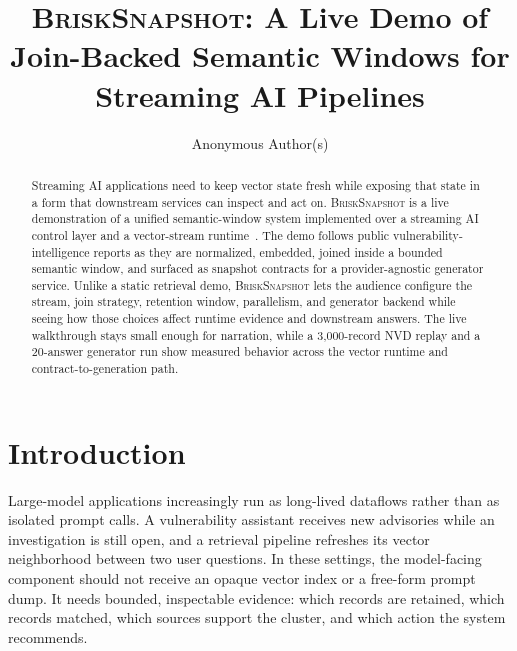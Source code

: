 \documentclass[sigconf,anonymous]{acmart}
\newcommand{\system}{\textsc{BriskSnapshot}}
\begin{document}
\title{\system{}: A Live Demo of Join-Backed Semantic Windows for Streaming AI Pipelines}

\author{Anonymous Author(s)}

\begin{abstract}
Streaming AI applications need to keep vector state fresh while exposing that state in a form that downstream services can inspect and act on. \system{} is a live demonstration of a unified semantic-window system implemented over a streaming AI control layer and a vector-stream runtime~\cite{sage_icml2026}. The demo follows public vulnerability-intelligence reports as they are normalized, embedded, joined inside a bounded semantic window, and surfaced as snapshot contracts for a provider-agnostic generator service. Unlike a static retrieval demo, \system{} lets the audience configure the stream, join strategy, retention window, parallelism, and generator backend while seeing how those choices affect runtime evidence and downstream answers. The live walkthrough stays small enough for narration, while a 3,000-record NVD replay and a 20-answer generator run show measured behavior across the vector runtime and contract-to-generation path.
\end{abstract}



\maketitle

\section{Introduction}

Large-model applications increasingly run as long-lived dataflows rather than as isolated prompt calls. A vulnerability assistant receives new advisories while an investigation is still open, and a retrieval pipeline refreshes its vector neighborhood between two user questions. In these settings, the model-facing component should not receive an opaque vector index or a free-form prompt dump. It needs bounded, inspectable evidence: which records are retained, which records matched, which sources support the cluster, and which action the system recommends.
\end{document}
